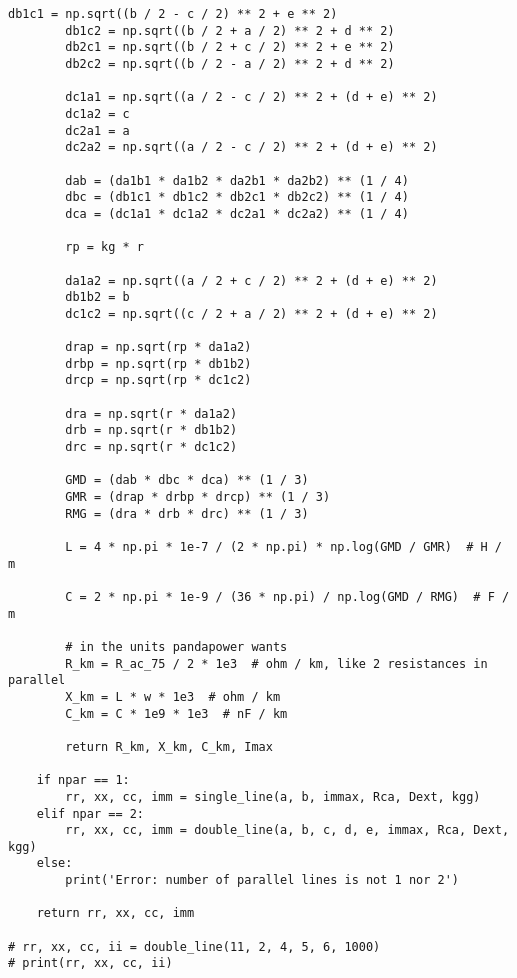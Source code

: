 \begin{lstlisting}[caption={Code for the calculation of lines}]
        db1c1 = np.sqrt((b / 2 - c / 2) ** 2 + e ** 2)
        db1c2 = np.sqrt((b / 2 + a / 2) ** 2 + d ** 2)
        db2c1 = np.sqrt((b / 2 + c / 2) ** 2 + e ** 2)
        db2c2 = np.sqrt((b / 2 - a / 2) ** 2 + d ** 2)

        dc1a1 = np.sqrt((a / 2 - c / 2) ** 2 + (d + e) ** 2)
        dc1a2 = c
        dc2a1 = a
        dc2a2 = np.sqrt((a / 2 - c / 2) ** 2 + (d + e) ** 2)

        dab = (da1b1 * da1b2 * da2b1 * da2b2) ** (1 / 4)
        dbc = (db1c1 * db1c2 * db2c1 * db2c2) ** (1 / 4)
        dca = (dc1a1 * dc1a2 * dc2a1 * dc2a2) ** (1 / 4)

        rp = kg * r

        da1a2 = np.sqrt((a / 2 + c / 2) ** 2 + (d + e) ** 2)
        db1b2 = b
        dc1c2 = np.sqrt((c / 2 + a / 2) ** 2 + (d + e) ** 2)

        drap = np.sqrt(rp * da1a2)
        drbp = np.sqrt(rp * db1b2)
        drcp = np.sqrt(rp * dc1c2)

        dra = np.sqrt(r * da1a2)
        drb = np.sqrt(r * db1b2)
        drc = np.sqrt(r * dc1c2)

        GMD = (dab * dbc * dca) ** (1 / 3)
        GMR = (drap * drbp * drcp) ** (1 / 3)
        RMG = (dra * drb * drc) ** (1 / 3)

        L = 4 * np.pi * 1e-7 / (2 * np.pi) * np.log(GMD / GMR)  # H / m

        C = 2 * np.pi * 1e-9 / (36 * np.pi) / np.log(GMD / RMG)  # F / m

        # in the units pandapower wants
        R_km = R_ac_75 / 2 * 1e3  # ohm / km, like 2 resistances in parallel
        X_km = L * w * 1e3  # ohm / km
        C_km = C * 1e9 * 1e3  # nF / km

        return R_km, X_km, C_km, Imax

    if npar == 1:
        rr, xx, cc, imm = single_line(a, b, immax, Rca, Dext, kgg)
    elif npar == 2:
        rr, xx, cc, imm = double_line(a, b, c, d, e, immax, Rca, Dext, kgg)
    else:
        print('Error: number of parallel lines is not 1 nor 2')

    return rr, xx, cc, imm

# rr, xx, cc, ii = double_line(11, 2, 4, 5, 6, 1000)
# print(rr, xx, cc, ii)

\end{lstlisting}
